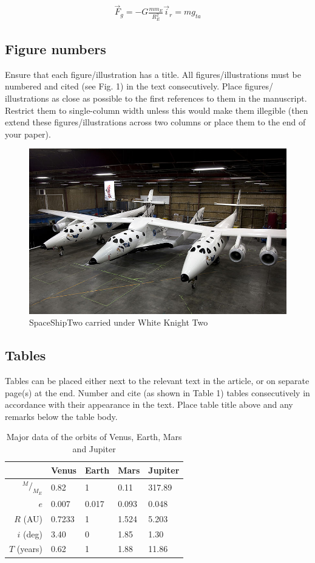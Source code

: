 \documentclass[]{iac}
\newcommand*\rfrac[2]{{{}^{#1}\!/_{#2}}} %
\begin{document}
\begin{align}
  \vec{F}_{g} = - G \frac{m m_E}{R_E^2}\vec{i}_r = mg_{ta}
\end{align}


\subsection{Figure numbers}
Ensure that each figure/illustration has a title. All
figures/illustrations must be numbered and cited (see Fig. 1) in the
text consecutively. Place figures/ illustrations as close as possible
to the first references to them in the manuscript. Restrict them to
single-column width unless this would make them illegible (then extend
these figures/illustrations across two columns or place them to the
end of your paper).

\begin{figure}
  \includegraphics[width=\columnwidth]{whiteknight.jpg}
  \caption{\label{fig:X}SpaceShipTwo carried under White Knight Two}
\end{figure}


\subsection{Tables}
Tables can be placed either next to the relevant text in the article,
or on separate page(s) at the end. Number and cite (as shown in Table
1) tables consecutively in accordance with their appearance in the
text. Place table title above and any remarks below the table body.


\begin{table}
  \caption{\label{table:X}Major data of the orbits of Venus, Earth,
    Mars and Jupiter}
  \begin{tabular}{rllll}
    \toprule
    & Venus & Earth & Mars & Jupiter \\
    \midrule
    $\rfrac{M}{M_E}$	& 0.82 		& 1 		& 0.11 		& 317.89	\\
    $e$					& 0.007		& 0.017		& 0.093		& 0.048		\\
    $R$ (AU)			& 0.7233	& 1			& 1.524		& 5.203		\\
    $i$ (deg)			& 3.40		& 0			& 1.85		& 1.30		\\
    $T$ (years)			& 0.62		& 1			& 1.88		& 11.86		\\
    \bottomrule
  \end{tabular}
\end{table}
\end{document}
